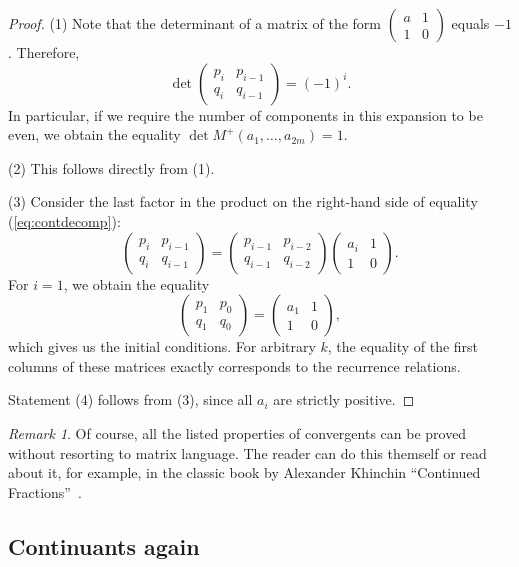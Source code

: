 \documentclass[a4paper,11pt]{amsart}
\theoremstyle{plain}
\theoremstyle{remark}
\newtheorem{remark}[theorem]{Remark}
\theoremstyle{definition}
\numberwithin{equation}{section}
\numberwithin{figure}{section}
\begin{document}
\begin{proof}
(1) Note that the determinant of a matrix of the form $\begin{pmatrix}a & 1\\1 & 0\end{pmatrix}$ equals $-1$. Therefore,
\[
\det \begin{pmatrix}p_i & p_{i-1}\\q_i & q_{i-1}\end{pmatrix} = (-1)^i.
\]
In particular, if we require the number of components in this expansion to be even, we obtain the equality $\det M^+(a_1, \dots, a_{2m}) = 1$.

(2) This follows directly from (1).

(3) Consider the last factor in the product on the right-hand side of equality (\ref{eq:contdecomp}):
\[
\begin{pmatrix}p_i & p_{i-1}\\q_i & q_{i-1}
\end{pmatrix}=
\begin{pmatrix}p_{i-1} & p_{i-2}\\q_{i-1} & q_{i-2}
\end{pmatrix}
\begin{pmatrix}a_i & 1\\1 & 0
\end{pmatrix}.
\]
For $i = 1$, we obtain the equality
\[
\begin{pmatrix}p_1 & p_0\\q_1 & q_0
\end{pmatrix}=
\begin{pmatrix}a_1 & 1\\1 & 0
\end{pmatrix},
\]
which gives us the initial conditions. For arbitrary $k$, the equality of the first columns of these matrices exactly corresponds to the recurrence relations.

Statement (4) follows from (3), since all $a_i$ are strictly positive.
\end{proof}

\begin{remark}
Of course, all the listed properties of convergents can be proved without resorting to matrix language. The reader can do this themself or read about it, for example, in the classic book by Alexander Khinchin ``Continued Fractions''~\cite{Khinchin97}. 
\end{remark}

\subsection{Continuants again}
\end{document}
